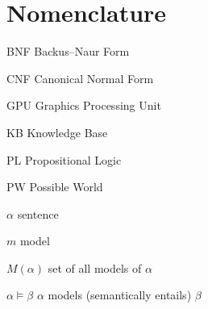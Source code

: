 \chapter{Nomenclature}

\begin{Nomencl}
	\item[BNF] Backus–Naur Form  
	\item[CNF] Canonical Normal Form  
	\item[GPU] Graphics Processing Unit    
    \item[KB] Knowledge Base
    \item[PL] Propositional Logic
    \item[PW] Possible World
    
   
   \item[$\alpha$]  sentence
   \item[$m$]  model
   \item[$M(\alpha)$]  set of all models of $\alpha$
   \item[$\alpha \models \beta$]  $\alpha$ models (semantically entails) $\beta$

\end{Nomencl}


\endinput
